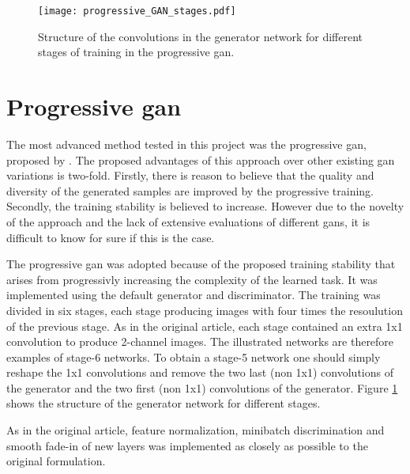 \begin{figure}[t]
    \texttt{[image: progressive\_GAN\_stages.pdf]}
    \caption{Structure of the convolutions in the generator network for different stages of training in the progressive \acrshort{gan}.}
    \label{fig:prog_stages}
\end{figure}

\section{Progressive \acrshort{gan}}
The most advanced method tested in this project was the progressive \acrshort{gan}, proposed by \textcite{karras2017progressive}. The proposed advantages of this approach over other existing \acrshort{gan} variations is two-fold. Firstly, there is reason to believe that the quality and diversity of the generated samples are improved by the progressive training. Secondly, the training stability is believed to increase. However due to the novelty of the approach and the lack of extensive evaluations of different \acrshort{gans}, it is difficult to know for sure if this is the case.

The progressive \acrshort{gan} was adopted because of the proposed training stability that arises from progressivly increasing the complexity of the learned task. It was implemented using the default generator and discriminator. The training was divided in six stages, each stage producing images with four times the resoulution of the previous stage. As in the original article, each stage contained an extra 1x1 convolution to produce 2-channel images. The illustrated networks are therefore examples of stage-6 networks. To obtain a stage-5 network one should simply reshape the 1x1 convolutions and remove the two last (non 1x1) convolutions of the generator and the two first (non 1x1) convolutions of the generator. Figure \ref{fig:prog_stages} shows the structure of the generator network for different stages.

As in the original article, feature normalization, minibatch discrimination and smooth fade-in of new layers was implemented as closely as possible to the original formulation.



